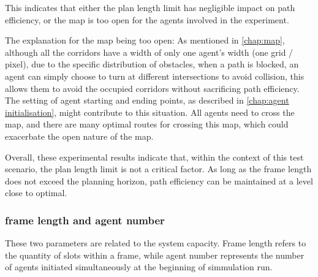 \begin{itemize}
    This indicates that either the plan length limit has negligible impact on path efficiency, or the map is too open for the agents involved in the experiment. 

    The explanation for the map being too open: 
    As mentioned in \ref{chap:map}, although all the corridors have a width of only one agent's width (one grid / pixel), due to the specific distribution of obstacles, 
    when a path is blocked, an agent can simply choose to turn at different intersections to avoid collision, 
    this allows them to avoid the occupied corridors without sacrificing path efficiency.
    The setting of agent starting and ending points, as described in \ref{chap:agent initialisation}, might contribute to this situation. All agents need to cross the map, and there are many optimal routes for crossing this map, which could exacerbate the open nature of the map.
\end{itemize}

Overall, these experimental results indicate that, within the context of this test scenario, the plan length limit is not a critical factor. As long as the frame length does not exceed the planning horizon, path efficiency can be maintained at a level close to optimal.

\subsubsection{frame length and agent number}

These two parameters are related to the system capacity. Frame length refers to the quantity of slots within a frame, while agent number represents the number of agents initiated simultaneously at the beginning of simmulation run.

